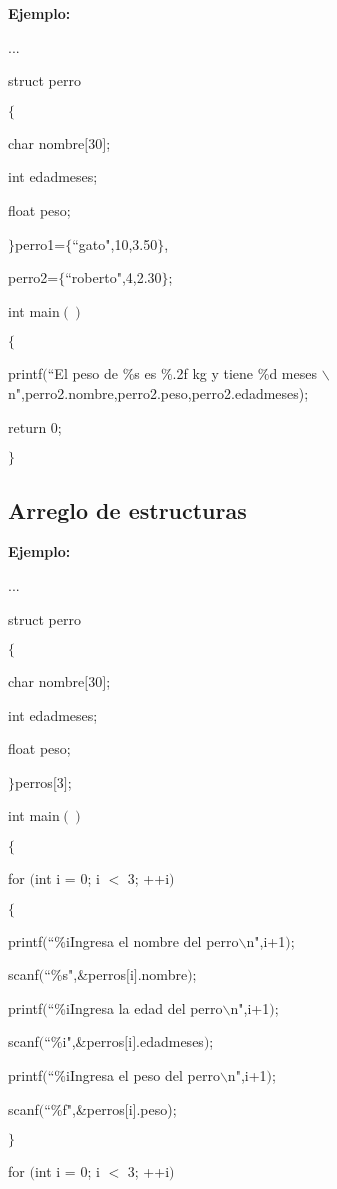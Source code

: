 \documentclass[]{article}
\begin{document}
	\textbf{Ejemplo:\\}
	
	...
	
	struct perro
	
	$\lbrace$
	
	char nombre$[$30$]$;
	
	int edadmeses;
	
	float peso;
	
	$\rbrace$perro1=$\lbrace$``gato",10,3.50$\rbrace$,
	
	perro2=$\lbrace$``roberto",4,2.30$\rbrace$;
	
	int main$()$
	
	$\lbrace$
	
	printf$($``El peso de \%s es \%.2f kg y tiene \%d meses $\backslash$n",perro2.nombre,perro2.peso,perro2.edadmeses);
	
	return 0;
	
	$\rbrace$
	
	\subsection{Arreglo de estructuras}
	
	\textbf{Ejemplo:\\}
	
	...
	
	struct perro
	
	$\lbrace$
	
	char nombre$[$30$]$;
	
	int edadmeses;
	
	float peso;
	
	$\rbrace$perros$[$3$]$;
	
	int main$()$
	
	$\lbrace$
	
	for $($int i = 0; i $<$ 3; ++i$)$
	
	$\lbrace$
	
	printf$($``\%iIngresa el nombre del perro$\backslash$n",i+1$)$;
	
	scanf$($``\%s",\&perros$[$i$]$.nombre$)$;
	
	printf$($``\%iIngresa la edad del perro$\backslash$n",i+1$)$;
	
	scanf$($``\%i",\&perros$[$i$]$.edadmeses$)$;
	
	printf$($``\%iIngresa el peso del perro$\backslash$n",i+1$)$;
	
	scanf$($``\%f",\&perros$[$i$]$.peso);
	
	$\rbrace$
	
	for $($int i = 0; i $<$ 3; ++i$)$
	
\end{document}
